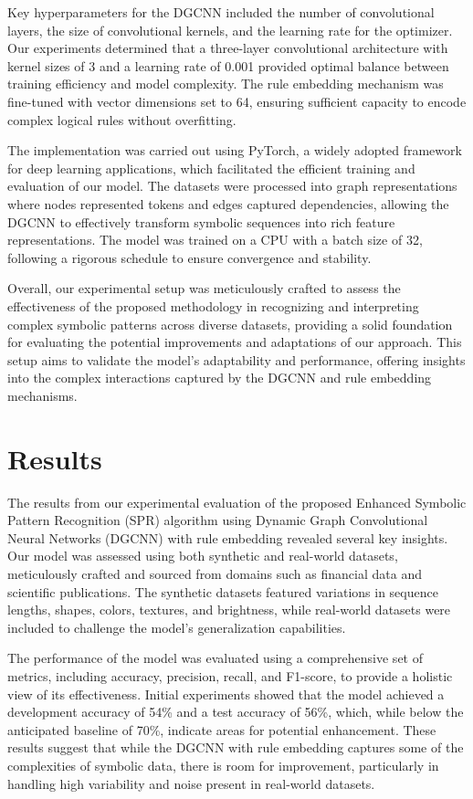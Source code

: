 \documentclass{article}
\begin{document}
Key hyperparameters for the DGCNN included the number of convolutional layers, the size of convolutional kernels, and the learning rate for the optimizer. Our experiments determined that a three-layer convolutional architecture with kernel sizes of 3 and a learning rate of 0.001 provided optimal balance between training efficiency and model complexity. The rule embedding mechanism was fine-tuned with vector dimensions set to 64, ensuring sufficient capacity to encode complex logical rules without overfitting.

The implementation was carried out using PyTorch, a widely adopted framework for deep learning applications, which facilitated the efficient training and evaluation of our model. The datasets were processed into graph representations where nodes represented tokens and edges captured dependencies, allowing the DGCNN to effectively transform symbolic sequences into rich feature representations. The model was trained on a CPU with a batch size of 32, following a rigorous schedule to ensure convergence and stability.

Overall, our experimental setup was meticulously crafted to assess the effectiveness of the proposed methodology in recognizing and interpreting complex symbolic patterns across diverse datasets, providing a solid foundation for evaluating the potential improvements and adaptations of our approach. This setup aims to validate the model's adaptability and performance, offering insights into the complex interactions captured by the DGCNN and rule embedding mechanisms.

\section{Results}
The results from our experimental evaluation of the proposed Enhanced Symbolic Pattern Recognition (SPR) algorithm using Dynamic Graph Convolutional Neural Networks (DGCNN) with rule embedding revealed several key insights. Our model was assessed using both synthetic and real-world datasets, meticulously crafted and sourced from domains such as financial data and scientific publications. The synthetic datasets featured variations in sequence lengths, shapes, colors, textures, and brightness, while real-world datasets were included to challenge the model's generalization capabilities.

The performance of the model was evaluated using a comprehensive set of metrics, including accuracy, precision, recall, and F1-score, to provide a holistic view of its effectiveness. Initial experiments showed that the model achieved a development accuracy of 54\% and a test accuracy of 56\%, which, while below the anticipated baseline of 70\%, indicate areas for potential enhancement. These results suggest that while the DGCNN with rule embedding captures some of the complexities of symbolic data, there is room for improvement, particularly in handling high variability and noise present in real-world datasets.
\end{document}
